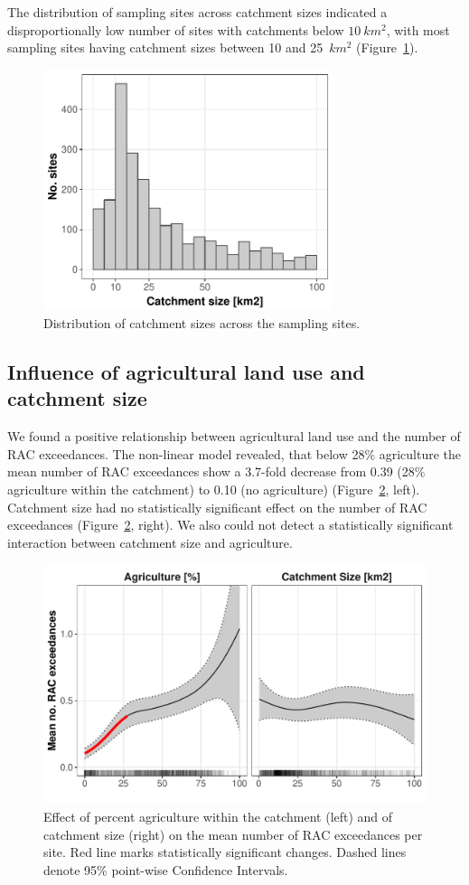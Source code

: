 \documentclass[journal=esthag,manuscript=article]{achemso}
\begin{document}
The distribution of sampling sites across catchment sizes indicated a disproportionally low number of sites with catchments below $10~km^2$, with
most sampling sites having catchment sizes between 10 and 25~$km^2$ (Figure~\ref{fig:fig3}). 


\begin{figure}[ht]
  \includegraphics[width=3.33in]{figure3.pdf}
  \caption{Distribution of catchment sizes across the sampling sites.}
  \label{fig:fig3}
\end{figure}


\subsection{Influence of agricultural land use and catchment size}
We found a positive relationship between agricultural land use and the number of RAC exceedances. 
The non-linear model revealed, that below 28\% agriculture the mean number of RAC exceedances show a 3.7-fold decrease from 0.39 (28\% agriculture within the catchment) to 0.10 (no agriculture) (Figure~\ref{fig:fig4}, left).
Catchment size had no statistically significant effect on the number of RAC exceedances (Figure~\ref{fig:fig4}, right).
We also could not detect a statistically significant interaction between catchment size and agriculture. 

\begin{figure}[ht]
  \includegraphics[width=6.5in]{figure4.pdf}
  \caption{Effect of percent agriculture within the catchment (left) and of catchment size (right) on the mean number of RAC exceedances per site. Red line marks statistically significant changes. Dashed lines denote 95\% point-wise Confidence Intervals.
  }
  \label{fig:fig4}
\end{figure}
\end{document}

